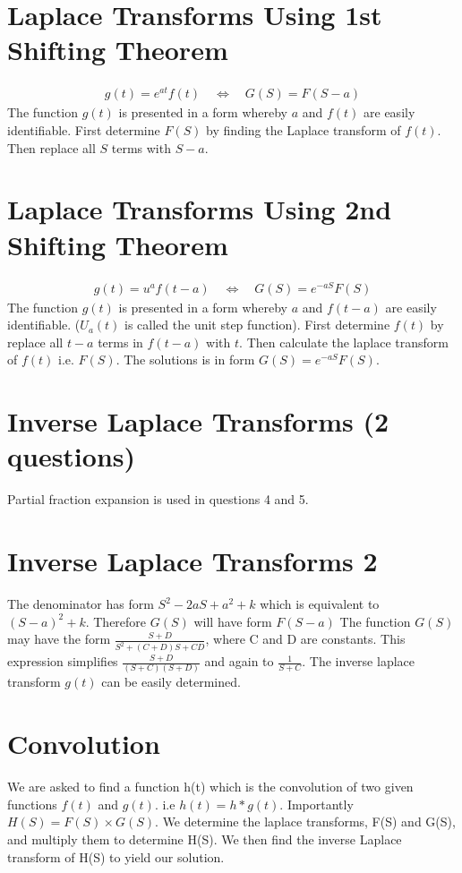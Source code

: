 \documentclass[12pt, a4paper]{article}
\begin{document}
\section{Laplace Transforms Using 1st Shifting Theorem}
\begin{eqnarray}
 g(t) = e^{at}f(t) \quad \Leftrightarrow \quad G(S)= F(S-a) \nonumber
\end{eqnarray}
The function $g(t)$ is presented in a form whereby $a$ and $f(t)$
are easily identifiable. First determine $F(S)$ by finding the
Laplace transform of $f(t)$. Then replace all $S$ terms with
$S-a$.

\section{Laplace Transforms Using 2nd Shifting Theorem}

\begin{eqnarray}
 g(t) = u^{a}f(t-a) \quad \Leftrightarrow \quad G(S)= e^{-aS}F(S) \nonumber
\end{eqnarray}
The function $g(t)$ is presented in a form whereby $a$ and
$f(t-a)$ are easily identifiable. ($U_{a}(t)$ is called the unit
step function). First determine $f(t)$ by replace all $t-a$ terms
in $f(t-a)$ with $t$. Then calculate the laplace transform of
$f(t)$ i.e. $F(S)$. The solutions is in form $G(S)= e^{-aS}F(S)$.

\section{Inverse Laplace Transforms (2 questions) }
Partial fraction expansion is used in questions 4 and 5.
\section{Inverse Laplace Transforms 2}

The denominator has form $S^2 - 2aS + a^2 + k$ which is equivalent
to $(S-a)^2 + k$. Therefore $G(S)$ will have form $F(S-a)$
\newline
The function $G(S)$ may have the form $\frac{S+D}{S^2 +(C+D)S +
CD}$, where C and D are constants. This expression simplifies
$\frac{S+D}{(S+C)(S+D)}$ and again to $\frac{1}{S+C}$. The inverse
laplace transform $g(t)$ can be easily determined.
\section{Convolution}
We are asked to find a function h(t) which is the convolution of
two given functions $f(t)$ and $g(t)$. i.e $h(t)=h*g(t)$.\newline
Importantly $H(S) = F(S)\times G(S)$. We determine the laplace
transforms, F(S) and G(S), and multiply them to determine H(S). We
then find the inverse Laplace transform of H(S) to yield our
solution.
\end{document}
